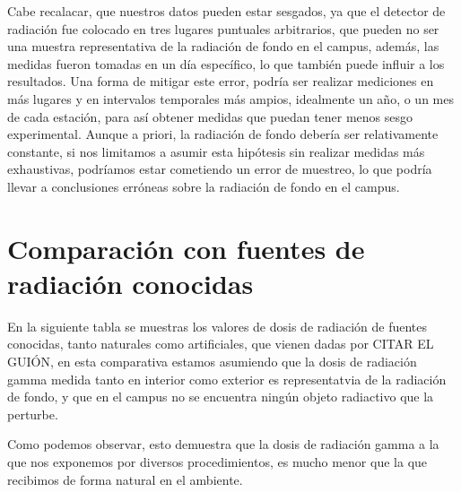 \documentclass[11pt]{article}
\begin{document}
Cabe recalacar, que nuestros datos pueden estar sesgados, ya que el detector de radiación fue colocado en tres lugares puntuales arbitrarios, 
que pueden no ser una muestra representativa de la radiación de fondo en el campus, además, las medidas fueron tomadas en un día específico, lo que también puede influir a los resultados.
Una forma de mitigar este error, podría ser realizar mediciones en más lugares y en intervalos temporales más ampios, idealmente un año, o un mes de cada estación, para así 
obtener medidas que puedan tener menos sesgo experimental. Aunque a priori, la radiación de fondo debería ser relativamente constante,
si nos limitamos a asumir esta hipótesis sin realizar medidas más exhaustivas, podríamos estar cometiendo un error de muestreo, lo que podría llevar a conclusiones erróneas sobre la radiación de fondo en el campus.


\section{Comparación con fuentes de radiación conocidas}
En la siguiente tabla se muestras los valores de dosis de radiación de fuentes conocidas, tanto naturales como artificiales, que vienen dadas por CITAR EL GUIÓN,
en esta comparativa estamos asumiendo que la dosis de radiación gamma medida tanto en interior como exterior es representatvia de la radiación de fondo, y que 
en el campus no se encuentra ningún objeto radiactivo que la perturbe.

Como podemos observar, esto demuestra que la dosis de radiación gamma a la que nos exponemos por diversos procedimientos, es mucho menor
que la que recibimos de forma natural en el ambiente.
\end{document}
